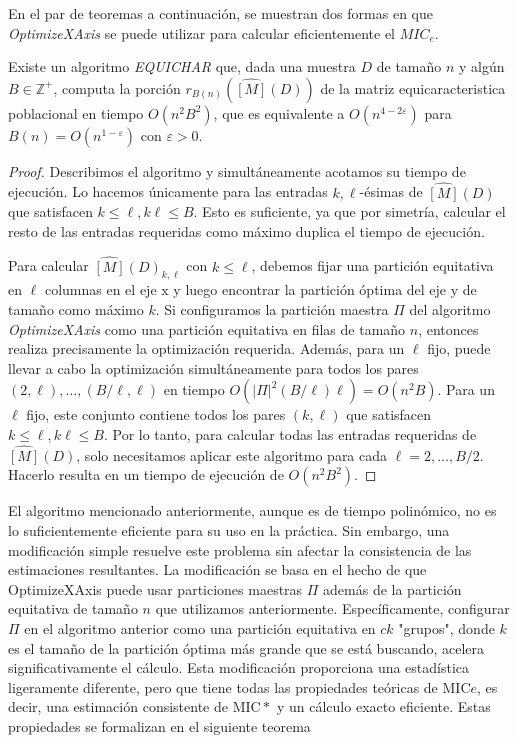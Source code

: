 	En el par de teoremas a continuaci\'on, se muestran dos formas en que \textit{OptimizeXAxis} se puede utilizar para calcular eficientemente el $MIC_e$. 

	\begin{thm}

		Existe un algoritmo  \textit{EQUICHAR} que, dada una muestra $D$ de tama\~no $n$ y alg\'un $B \in \mathbb{Z}^{+}$, computa la porci\'on $r_{B(n)}(\widehat{[M]}(D))$ de la matriz equicaracteristica poblacional en tiempo $O\left(n^2 B^2\right)$, que es equivalente a $O\left(n^{4-2 \varepsilon}\right)$ para $B(n)=O\left(n^{1-\varepsilon}\right)$ con $\varepsilon>0$.
	\end{thm}

	\begin{proof}
		Describimos el algoritmo y simult\'aneamente acotamos su tiempo de ejecuci\'on. Lo hacemos \'unicamente para las entradas $k, \ell$-\'esimas de $\widehat{[M]}(D)$ que satisfacen $k \leq \ell, k \ell \leq B$. Esto es suficiente, ya que por simetr\'ia, calcular el resto de las entradas requeridas como m\'aximo duplica el tiempo de ejecuci\'on.

		Para calcular $\widehat{[M]}(D)_{k, \ell}$ con $k \leq \ell$, debemos fijar una partici\'on equitativa en $\ell$ columnas en el eje $\mathrm{x}$ y luego encontrar la partici\'on \'optima del eje $\mathrm{y}$ de tama\~no como m\'aximo $k$. Si configuramos la partici\'on maestra $\Pi$ del algoritmo \textit{OptimizeXAxis} como una partici\'on equitativa en filas de tama\~no $n$, entonces realiza precisamente la optimizaci\'on requerida. Adem\'as, para un $\ell$ fijo, puede llevar a cabo la optimizaci\'on simult\'aneamente para todos los pares ${(2, \ell), \ldots,(B / \ell, \ell)}$ en tiempo $O\left(|\Pi|^2(B / \ell) \ell\right)=O\left(n^2 B\right)$. Para un $\ell$ fijo, este conjunto contiene todos los pares $(k, \ell)$ que satisfacen $k \leq \ell, k \ell \leq B$. Por lo tanto, para calcular todas las entradas requeridas de $\widehat{[M]}(D)$, solo necesitamos aplicar este algoritmo para cada $\ell=2, \ldots, B / 2$. Hacerlo resulta en un tiempo de ejecuci\'on de $O\left(n^2 B^2\right)$.
	\end{proof}

	El algoritmo mencionado anteriormente, aunque es de tiempo polin\'omico, no es lo suficientemente eficiente para su uso en la pr\'actica. Sin embargo, una modificaci\'on simple resuelve este problema sin afectar la consistencia de las estimaciones resultantes. La modificaci\'on se basa en el hecho de que OptimizeXAxis puede usar particiones maestras $\Pi$ adem\'as de la partici\'on equitativa de tama\~no $n$ que utilizamos anteriormente. Espec\'ificamente, configurar $\Pi$ en el algoritmo anterior como una partici\'on equitativa en $c k$ "grupos", donde $k$ es el tama\~no de la partici\'on \'optima m\'as grande que se est\'a buscando, acelera significativamente el c\'alculo. Esta modificaci\'on proporciona una estad\'istica ligeramente diferente, pero que tiene todas las propiedades te\'oricas de $\mathrm{MIC}e$, es decir, una estimaci\'on consistente de $\mathrm{MIC}*$ y un c\'alculo exacto eficiente. Estas propiedades se formalizan en el siguiente teorema

